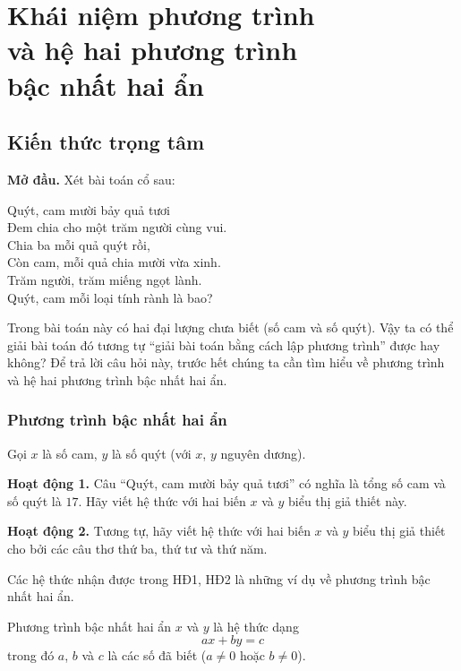 \section{Khái niệm phương trình\\và hệ hai phương trình\\bậc nhất hai ẩn}

\begin{lesson}
    \subsection{Kiến thức trọng tâm}

    \textbf{Mở đầu.} Xét bài toán cổ sau:

    Quýt, cam mười bảy quả tươi\\
    Đem chia cho một trăm người cùng vui.\\
    Chia ba mỗi quả quýt rồi,\\
    Còn cam, mỗi quả chia mười vừa xinh.\\
    Trăm người, trăm miếng ngọt lành.\\
    Quýt, cam mỗi loại tính rành là bao?

    Trong bài toán này có hai đại lượng chưa biết (số cam và số quýt). Vậy ta có thể giải bài toán đó tương tự ``giải bài toán bằng cách lập phương trình'' được hay không? Để trả lời câu hỏi này, trước hết chúng ta cần tìm hiểu về phương trình và hệ hai phương trình bậc nhất hai ẩn.

    \subsubsection{Phương trình bậc nhất hai ẩn}

    Gọi $x$ là số cam, $y$ là số quýt (với $x$, $y$ nguyên dương).

    \textbf{Hoạt động 1.} Câu ``Quýt, cam mười bảy quả tươi'' có nghĩa là tổng số cam và số quýt là $17$. Hãy viết hệ thức với hai biến $x$ và $y$ biểu thị giả thiết này.

    \answerline

    \textbf{Hoạt động 2.} Tương tự, hãy viết hệ thức với hai biến $x$ và $y$ biểu thị giả thiết cho bởi các câu thơ thứ ba, thứ tư và thứ năm.

    \answerline
    \answerline

    Các hệ thức nhận được trong HĐ1, HĐ2 là những ví dụ về phương trình bậc nhất hai ẩn.

    \begin{keyconcept}
        Phương trình bậc nhất hai ẩn $x$ và $y$ là hệ thức dạng
        \[
            ax+by=c \tag{1}
        \]
        trong đó $a$, $b$ và $c$ là các số đã biết ($a\ne0$ hoặc $b\ne0$).


\end{keyconcept}
\end{lesson}
